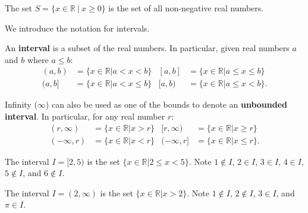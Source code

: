\begin{example}
    The set $S = \{x \in \mathbb{R} \ | \ x \geq 0 \}$ is the set of all non-negative real numbers.
\end{example}

We introduce the notation for intervals.
\begin{definition}
    An \textbf{interval} is a subset of the real numbers. In particular, given real numbers $a$ and $b$ where $a \leq b$:
    \begin{align*}
        (a,b) &= \{x \in \mathbb{R} \vert a < x < b\} & [a,b] &= \{x \in \mathbb{R} \vert a \leq x \leq b\}\\
        (a,b] &= \{x \in \mathbb{R} \vert a < x \leq b\} & [a,b) &= \{x \in \mathbb{R} \vert a \leq x < b\}.
    \end{align*}

    Infinity ($\infty$) can also be used as one of the bounds to denote an \textbf{unbounded interval}. In particular, for any real number $r$:
    \begin{align*}
        (r, \infty) &= \{x \in \mathbb{R} \vert x > r\} & [r, \infty) &= \{x \in \mathbb{R} \vert x \geq r\}\\
        (-\infty,r) &= \{x \in \mathbb{R} \vert x < r\} & (-\infty,r] &= \{x \in \mathbb{R} \vert x \leq r\}.
    \end{align*}
\end{definition}
\begin{example}
    The interval $I = [2, 5)$ is the set $\{x \in \mathbb{R} \vert 2 \leq x < 5\}$. Note $1 \notin I$, $2 \in I$, $3 \in I$, $4 \in I$, $5 \notin I$, and $6 \notin I$.
\end{example}
\begin{example}
    The interval $I = (2, \infty)$ is the set $\{x \in \mathbb{R} \vert x > 2\}$. Note $1 \notin I$, $2 \notin I$, $3 \in I$, and $\pi \in I$.
\end{example}

